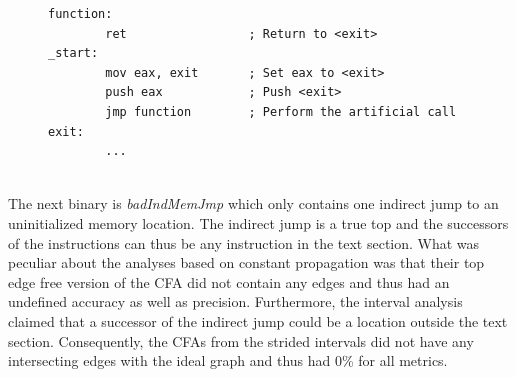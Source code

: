 \documentclass{kththesis}
\renewcommand{\it}[1]{\textit{#1}}
\begin{document}
\begin{figure}[!ht]
    \centering
\begin{tcolorbox}
\begin{verbatim}
function:
        ret                 ; Return to <exit>
_start:
        mov eax, exit       ; Set eax to <exit>
        push eax            ; Push <exit>
        jmp function        ; Perform the artificial call
exit:
        ...
\end{verbatim}
\end{tcolorbox}
\end{figure}
\\
The next binary is \it{badIndMemJmp} which only contains one indirect jump to an uninitialized memory location. The indirect jump is a true top and the successors of the instructions can thus be any instruction in the text section. What was peculiar about the analyses based on constant propagation was that their top edge free version of the CFA did not contain any edges and thus had an undefined accuracy as well as precision. Furthermore, the interval analysis claimed that a successor of the indirect jump could be a location outside the text section. Consequently, the CFAs from the strided intervals did not have any intersecting edges with the ideal graph and thus had 0\% for all metrics.
\end{document}
